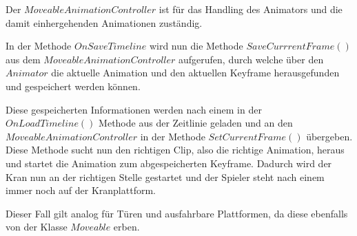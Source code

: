 Der $MoveableAnimationController$ ist für das Handling des Animators und die damit einhergehenden Animationen zuständig.

In der Methode $OnSaveTimeline$ wird nun die Methode $SaveCurrrentFrame()$ aus dem $MoveableAnimationController$ aufgerufen, durch welche über den $Animator$ die aktuelle Animation und den aktuellen Keyframe herausgefunden und gespeichert werden können.

Diese gespeicherten Informationen werden nach einem  in der $OnLoadTimeline()$ Methode aus der Zeitlinie geladen und an den $MoveableAnimationController$ in der Methode $SetCurrentFrame()$ übergeben. Diese Methode sucht nun den richtigen Clip, also die richtige Animation, heraus und startet die Animation zum abgespeicherten Keyframe.
Dadurch wird der Kran nun an der richtigen Stelle gestartet und der Spieler steht nach einem  immer noch auf der Kranplattform.

Dieser Fall gilt analog für Türen und ausfahrbare Plattformen, da diese ebenfalls von der Klasse $Moveable$ erben.

